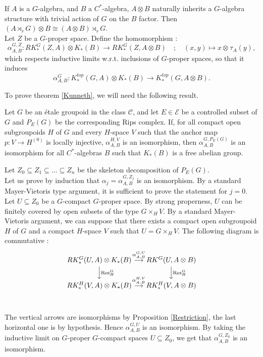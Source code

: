 If $A$ is a $G$-algebra, and $B$ a $C^*$-algebra, $A\otimes B$ naturally inherits a $G$-algebra structure with trivial action of $G$ on the $B$ factor. Then $(A\rtimes_r G)\otimes B \cong (A\otimes B)\rtimes_r G$.\\

Let $Z$ be a $G$-proper space. Define the homomorphism :
\[\alpha_{A,B}^{G,Z} : RK^G_*(Z,A)\otimes K_*(B)\rightarrow RK_*^G(Z,A\otimes B) \quad ; \quad (x,y)\mapsto x\otimes_{}   \tau_A(y),\]
which respects inductive limits w.r.t. inclusions of $G$-proper spaces, so that it induces
\[\alpha_{A,B}^G : K_*^{top}(G,A)\otimes K_*(B)\rightarrow K_*^{top}(G,A\otimes B ).\]

To prove theorem \ref{Kunneth}, we will need the following result.

\begin{thm}\label{TopologicalKunneth}
Let $G$ be an étale groupoid in the class $\mathcal C$, and let $E\in\mathcal E$ be a controlled subset of $G$ and $P_E(G)$ be the corresponding Rips complex. If, for all compact open subgroupoids $H$ of $G$ and every $H$-space $V$ such that the anchor map $p : V\rightarrow H^{(0)}$ is locally injective, $\alpha_{A,B}^{H,V}$ is an isomorphism, then $\alpha_{A,B}^{G,P_E(G)}$ is an isomorphism for all $C^*$-algebras $B$ such that $K_*(B)$ is a free abelian group.
\end{thm}

\begin{dem}
Let $Z_0\subseteq Z_1\subseteq ... \subseteq Z_n $ be the skeleton decomposition of $P_E(G)$.\\

Let us prove by induction that $\alpha_j=\alpha^{G,Z_j}_{A,B}$ is an isomorphism. By a standard Mayer-Vietoris type argument, %
it is sufficient to prove the statement for $j=0$.\\

Let $U\subseteq Z_0$ be a $G$-compact $G$-proper space. By strong properness, $U$ can be finitely covered by open subsets of the type $G \times_H V$. By a standard Mayer-Vietoris argument, we can suppose that there exists a compact open subgroupoid $H$ of $G$ and a compact $H$-space $V$ such that $U = G \times_H V$. The following diagram is commutative :
\[\begin{tikzcd}[column sep = small] 
RK_*^G(U,A)\otimes K_*(B) \arrow{r}{\alpha_{A,B}^{G,U}} \arrow{d}{\text{Res}_H^G} & RK^G(U, A\otimes B) \arrow{d}{\text{Res}_H^G}\\
RK_*^H(V, A)\otimes K_*(B) \arrow{r}{\alpha_{ A,B}^{H,V}} & 
	RK_*^H(V,  A\otimes B)\\
\end{tikzcd}\]

The vertical arrows are isomorphisms by Proposition \ref{Restriction}, the last horizontal one is by hypothesis. Hence $\alpha_{A,B}^{G,U}$ is an isomorphism. By taking the inductive limit on $G$-proper $G$-compact spaces $U\subseteq Z_0$, we get that $\alpha_{A,B}^{G,Z_0}$ is an isomorphism.
\end{dem}

